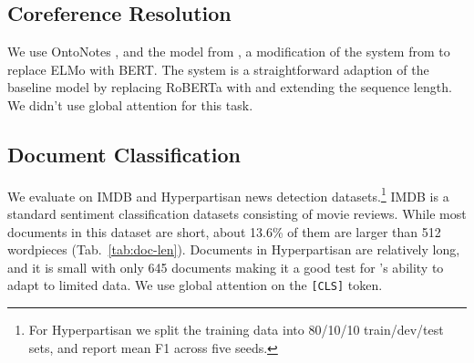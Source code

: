 



\subsection{Coreference Resolution}
We use OntoNotes \cite{pradhan-etal-2012-conll}, and the model from \citet{joshi-etal-2019-bert}, a modification of the system from \citet{lee-etal-2018-higher} to replace ELMo with BERT.
The \model system is a straightforward adaption of the baseline model by replacing RoBERTa with \model and extending the sequence length.
We didn't use global attention for this task. 

\subsection{Document Classification }
We evaluate on IMDB \cite{imdb} and Hyperpartisan news detection \cite{hyperpartisan} datasets.\footnote{%
For Hyperpartisan we split the training data into 80/10/10 train/dev/test sets, and report mean F1 across five seeds.} IMDB is a standard sentiment classification datasets consisting of movie reviews. While most documents in this dataset are short, about 13.6\% of them are larger than 512 wordpieces (Tab.~\ref{tab:doc-len}).
Documents in Hyperpartisan are relatively long, and it is small with only 645 documents making it a good test for \model's ability to adapt to limited data. We use global attention 
on the \texttt{[CLS]} token. 


